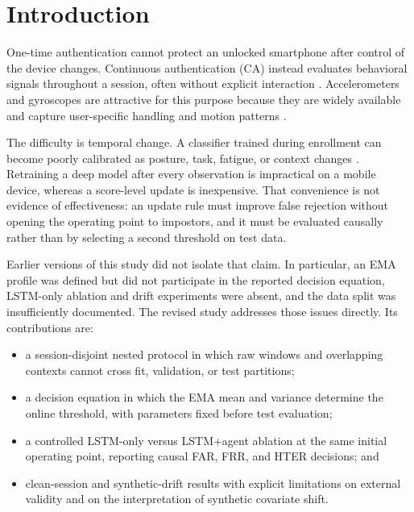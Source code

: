 \documentclass[3p,times,procedia]{elsarticle}
\begin{document}
\section{Introduction}
\label{sec:intro}

One-time authentication cannot protect an unlocked smartphone after control of
the device changes. Continuous authentication (CA) instead evaluates behavioral
signals throughout a session, often without explicit interaction
\cite{alzubaidi_authentication_2016,stylios_behavioral_2021}. Accelerometers and
gyroscopes are attractive for this purpose because they are widely available
and capture user-specific handling and motion patterns
\cite{sitova_hmog_2016,abuhamad_sensorbased_2021}.

The difficulty is temporal change. A classifier trained during enrollment can
become poorly calibrated as posture, task, fatigue, or context changes
\cite{verma_data-driven_2022}. Retraining a deep model after every observation
is impractical on a mobile device, whereas a score-level update is inexpensive.
That convenience is not evidence of effectiveness: an update rule must improve
false rejection without opening the operating point to impostors, and it must
be evaluated causally rather than by selecting a second threshold on test data.

Earlier versions of this study did not isolate that claim. In particular, an
EMA profile was defined but did not participate in the reported decision
equation, LSTM-only ablation and drift experiments were absent, and the data
split was insufficiently documented. The revised study addresses those issues
directly. Its contributions are:

\begin{itemize}
\item a session-disjoint nested protocol in which raw windows and overlapping
contexts cannot cross fit, validation, or test partitions;
\item a decision equation in which the EMA mean and variance determine the
online threshold, with parameters fixed before test evaluation;
\item a controlled LSTM-only versus LSTM+agent ablation at the same initial
operating point, reporting causal FAR, FRR, and HTER decisions; and
\item clean-session and synthetic-drift results with explicit limitations on
external validity and on the interpretation of synthetic covariate shift.
\end{itemize}
\end{document}
